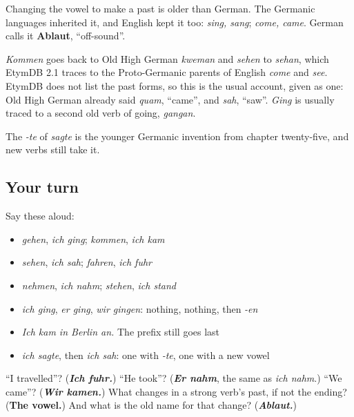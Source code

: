 \begin{cousinweb}
Changing the vowel to make a past is older than German. The Germanic languages inherited it, and English kept it too: \emph{sing, sang}; \emph{come, came}. German calls it \textbf{Ablaut}, \textquotedblleft{}off-sound\textquotedblright{}.

\emph{Kommen} goes back to Old High German \emph{kweman} and \emph{sehen} to \emph{sehan}, which EtymDB 2.1 traces to the Proto-Germanic parents of English \emph{come} and \emph{see}. EtymDB does not list the past forms, so this is the usual account, given as one: Old High German already said \emph{quam}, \textquotedblleft{}came\textquotedblright{}, and \emph{sah}, \textquotedblleft{}saw\textquotedblright{}. \emph{Ging} is usually traced to a second old verb of going, \emph{gangan}.

The \emph{-te} of \emph{sagte} is the younger Germanic invention from chapter twenty-five, and new verbs still take it.
\end{cousinweb}

\subsection*{Your turn}
Say these aloud:

\begin{itemize}
\raggedright
  \item \emph{gehen}, \emph{ich ging}; \emph{kommen}, \emph{ich kam}
  \item \emph{sehen}, \emph{ich sah}; \emph{fahren}, \emph{ich fuhr}
  \item \emph{nehmen}, \emph{ich nahm}; \emph{stehen}, \emph{ich stand}
  \item \emph{ich ging}, \emph{er ging}, \emph{wir gingen}: nothing, nothing, then \emph{-en}
  \item \emph{Ich kam in Berlin an.} The prefix still goes last
  \item \emph{ich sagte}, then \emph{ich sah}: one with \emph{-te}, one with a new vowel
\end{itemize}

\begin{tcolorbox}[breakable,colback=teal!4,colframe=teal!35!black,title={Before you move on}]
\textquotedblleft{}I travelled\textquotedblright{}? (\emph{\textbf{Ich fuhr.}}) \textquotedblleft{}He took\textquotedblright{}? (\emph{\textbf{Er nahm}}, the same as \emph{ich nahm}.) \textquotedblleft{}We came\textquotedblright{}? (\emph{\textbf{Wir kamen.}}) What changes in a strong verb's past, if not the ending? (\textbf{The vowel.}) And what is the old name for that change? (\emph{\textbf{Ablaut.}})
\end{tcolorbox}
